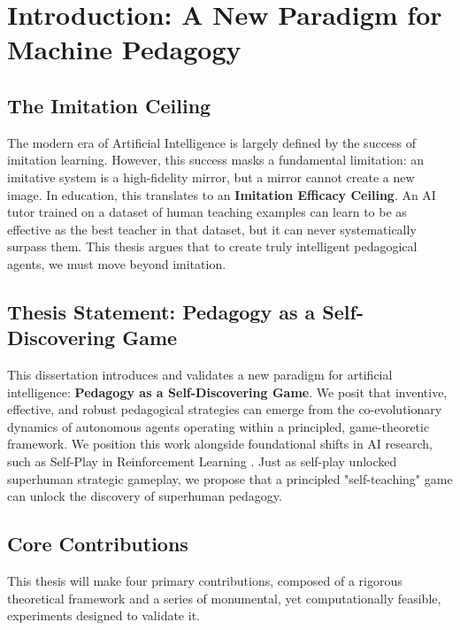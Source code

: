 \chapter{Introduction: A New Paradigm for Machine Pedagogy}

\section{The Imitation Ceiling}
The modern era of Artificial Intelligence is largely defined by the success of imitation learning. However, this success masks a fundamental limitation: an imitative system is a high-fidelity mirror, but a mirror cannot create a new image. In education, this translates to an \textbf{Imitation Efficacy Ceiling}. An AI tutor trained on a dataset of human teaching examples can learn to be as effective as the best teacher in that dataset, but it can never systematically surpass them. This thesis argues that to create truly intelligent pedagogical agents, we must move beyond imitation.

\section{Thesis Statement: Pedagogy as a Self-Discovering Game}
This dissertation introduces and validates a new paradigm for artificial intelligence: \textbf{Pedagogy as a Self-Discovering Game}. We posit that inventive, effective, and robust pedagogical strategies can emerge from the co-evolutionary dynamics of autonomous agents operating within a principled, game-theoretic framework. We position this work alongside foundational shifts in AI research, such as Self-Play in Reinforcement Learning \citep{silver2017mastering}. Just as self-play unlocked superhuman strategic gameplay, we propose that a principled "self-teaching" game can unlock the discovery of superhuman pedagogy.

\section{Core Contributions}
This thesis will make four primary contributions, composed of a rigorous theoretical framework and a series of monumental, yet computationally feasible, experiments designed to validate it.

